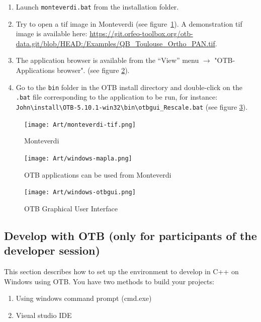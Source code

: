 \documentclass[10pt,a4paper]{article}
\begin{document}
\begin{enumerate}

\item Launch \texttt{monteverdi.bat} from the installation folder.

\item Try to open a tif image in Monteverdi (see
figure~\ref{fig:monteverdi}). A demonstration tif image is available here: \url{https://git.orfeo-toolbox.org/otb-data.git/blob/HEAD:/Examples/QB\_Toulouse\_Ortho\_PAN.tif}.

\item The application browser is available from the ``View'' menu 
$\rightarrow$ "OTB-Applications browser".
(see figure \ref{fig:windows-mapla}).

\item Go to the \texttt{bin} folder in the OTB install directory and double-click on the \texttt{.bat} file corresponding to the application to be run, for instance:\\
\texttt{John{\textbackslash}install{\textbackslash}OTB-5.10.1-win32{\textbackslash}bin{\textbackslash}otbgui\_Rescale.bat}
(see figure \ref{fig:windows-otbgui}).

\end{enumerate}

\begin{figure}[!htbp]
  \center
  \texttt{[image: Art/monteverdi-tif.png]}
  \caption[]{Monteverdi}
  \label{fig:monteverdi}
\end{figure}

\begin{figure}[!htbp]
  \center
  \texttt{[image: Art/windows-mapla.png]}
  \caption[]{OTB applications can be used from Monteverdi}
  \label{fig:windows-mapla}
\end{figure}

\begin{figure}[!htbp]
  \center
  \texttt{[image: Art/windows-otbgui.png]}
  \caption[]{OTB Graphical User Interface}
  \label{fig:windows-otbgui}
\end{figure}


\subsection{Develop with OTB (only for participants of the developer session)}

This section describes how to set up the environment to develop in C++ on
Windows using OTB.
You have two methods to build your projects:
\begin{enumerate}
\item Using windows command prompt (cmd.exe)
\item Visual studio IDE
\end{enumerate}
\end{document}
